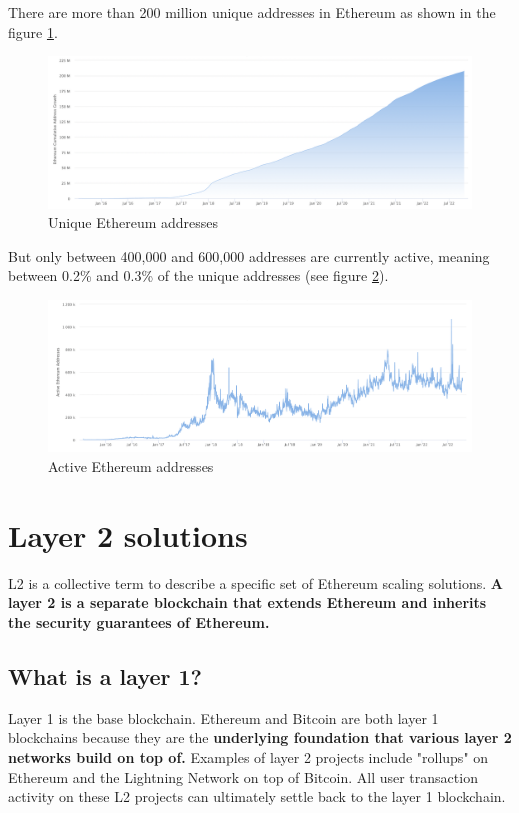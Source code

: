 \documentclass[MSE,Master,english]{twbook}%
\begin{document}
There are more than 200 million unique addresses in Ethereum as shown in the figure \ref{fig:uniqueAddr}.
\begin{figure}[H]
  \centering
  \includegraphics[width=\textwidth]{unique_addresses.png}
  \caption{Unique Ethereum addresses \cite{etherscan}}
  \label{fig:uniqueAddr}
\end{figure}

But only between 400,000 and 600,000 addresses are currently active, meaning between 0.2\% and 0.3\% of the unique addresses (see figure \ref{fig:activeAddr}).
\begin{figure}[H]
  \centering
  \includegraphics[width=\textwidth]{active_addresses.png}
  \caption{Active Ethereum addresses \cite{etherscan}}
  \label{fig:activeAddr}
\end{figure}

\section{Layer 2 solutions\label{layer2}}
\ac{L2}\cite{l2} is a collective term to describe a specific set of Ethereum scaling solutions. \textbf{A layer 2 is a separate blockchain that extends Ethereum and inherits the security guarantees of Ethereum.}

\subsection{What is a layer 1?}
Layer 1 is the base blockchain. Ethereum and Bitcoin are both layer 1 blockchains because they are the \textbf{underlying foundation that various layer 2 networks build on top of.} Examples of layer 2 projects include "rollups" on Ethereum and the Lightning Network on top of Bitcoin. All user transaction activity on these \ac{L2} projects can ultimately settle back to the layer 1 blockchain.
\end{document}
